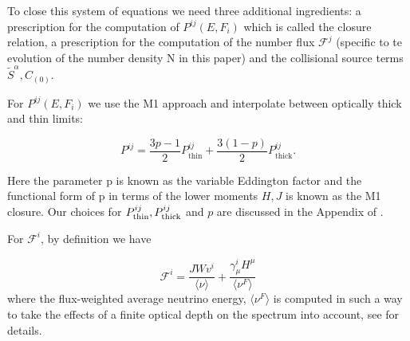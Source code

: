 To close this system of equations we need three additional ingredients: a prescription for the computation of $P^{ij}(E, F_i)$ which is called the closure relation, a prescription for the computation of the number flux $\mathcal{F}^j$ (specific to te evolution of the number density N in this paper) and the collisional source terms $\tilde{S}^\alpha, C_{(0)}$.

For $P^{ij}(E, F_i)$  we use the M1 approach and interpolate between optically thick and thin limits:

\begin{equation}
P^{ij} = \frac{3p-1}{2}P^{ij}_{\text{thin}} + \frac{3(1-p)}{2}P^{ij}_{\text{thick}}.
\end{equation}

Here the parameter p is known as the variable Eddington factor and the functional form of p in terms of the lower moments $H,J$ is known as the M1 closure. Our choices for $P^{ij}_{\rm thin}, P^{ij}_{\rm thick}$ and $p$ are discussed in the Appendix of \cite{foucartm1:2015}.

For $\mathcal{F}^i$, by definition we have

\begin{equation}
  \mathcal{F}^i = \frac{JWv^i}{\langle \nu \rangle} + \frac{\gamma^i_\mu H^\mu}{\langle \nu^F \rangle}
\end{equation}
%
where the flux-weighted average neutrino energy,  $\langle \nu^F \rangle$ is computed in such a way to take the effects of a finite optical depth on the spectrum into account, see \cite{foucart:2015gaa} for details.

